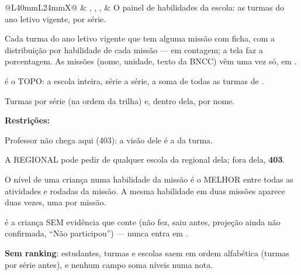 \begin{tabularx}{\linewidth}{@{}L{40mm}L{24mm}X@{}}
 & , , ,  & O painel de habilidades da escola: as turmas do ano letivo vigente, por série.\par Cada turma do ano letivo vigente que tem alguma missão com ficha, com a distribuição por habilidade de cada missão --- em contagem; a tela faz a porcentagem. As missões (nome, unidade, texto da BNCC) vêm uma vez só, em .\par {} é o TOPO: a escola inteira, série a série, a soma de todas as turmas de .\par Turmas por série (na ordem da trilha) e, dentro dela, por nome.\par \textbf{Restrições:}\par \hspace*{1em}\textbullet{} Professor não chega aqui (403): a visão dele é a da turma.\par \hspace*{1em}\textbullet{} A REGIONAL pode pedir  de qualquer escola da regional dela; fora dela, \textbf{403}.\par \hspace*{1em}\textbullet{} O nível de uma criança numa habilidade da missão é o MELHOR entre todas as atividades e rodadas da missão. A mesma habilidade em duas missões aparece duas vezes, uma por missão.\par \hspace*{1em}\textbullet{}  é a criança SEM evidência que conte (não fez, saiu antes, projeção ainda não confirmada, \enquote{Não participou}) --- nunca entra em .\par \hspace*{1em}\textbullet{} \textbf{Sem ranking}: estudantes, turmas e escolas saem em ordem alfabética (turmas por série antes), e nenhum campo soma níveis numa nota.\\

\end{tabularx}
